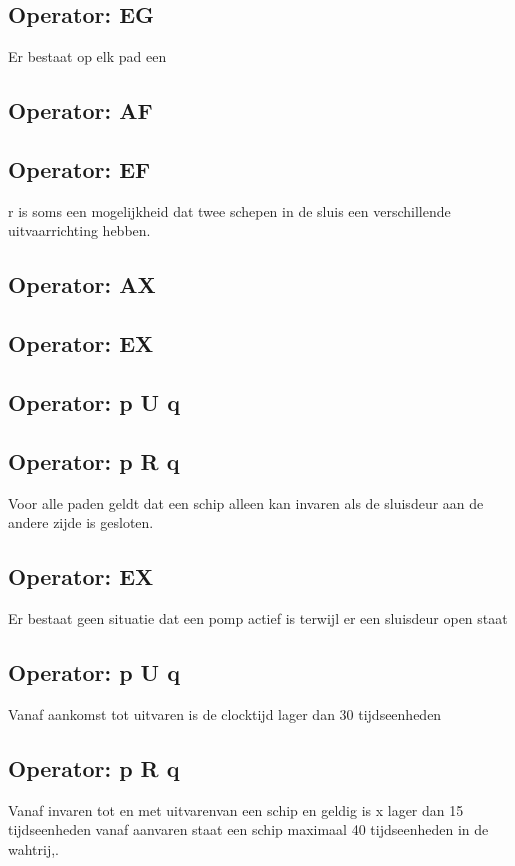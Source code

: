  \subsection{Operator: EG}
 Er bestaat op elk pad een 
 
 \subsection{Operator: AF}
 
 \subsection{Operator: EF}
 r is soms een mogelijkheid dat twee schepen in de sluis een verschillende uitvaarrichting hebben.
 \subsection{Operator: AX}
 
 
 \subsection{Operator: EX}
 
 \subsection{Operator: p U q}
 
 \subsection{Operator: p R q}
 
 
 Voor alle paden geldt dat een schip alleen kan invaren als de sluisdeur aan de andere zijde is gesloten.
 \subsection{Operator: EX}
 Er bestaat geen situatie dat een pomp actief is terwijl er een sluisdeur open staat
 \subsection{Operator: p U q}
 Vanaf aankomst tot uitvaren is de clocktijd lager dan 30 tijdseenheden 
 \subsection{Operator: p R q}
 Vanaf invaren tot en met uitvarenvan een schip en geldig is x lager dan 15 tijdseenheden
 vanaf aanvaren staat een schip maximaal 40 tijdseenheden in de wahtrij,.
 
